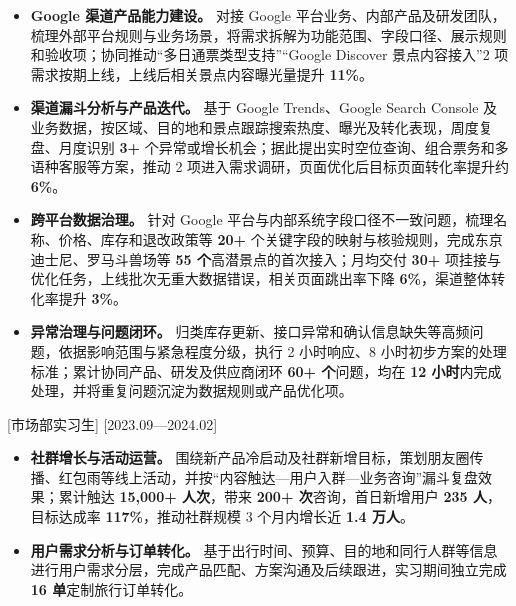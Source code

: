 \documentclass{resume}
\begin{document}
\begin{itemize}

\item \textbf{Google 渠道产品能力建设。} 对接 Google 平台业务、内部产品及研发团队，梳理外部平台规则与业务场景，将需求拆解为功能范围、字段口径、展示规则和验收项；协同推动“多日通票类型支持”“Google Discover 景点内容接入”2 项需求按期上线，上线后相关景点内容曝光量提升 \textbf{11\%}。

\item \textbf{渠道漏斗分析与产品迭代。} 基于 Google Trends、Google Search Console 及业务数据，按区域、目的地和景点跟踪搜索热度、曝光及转化表现，周度复盘、月度识别 \textbf{3+} 个异常或增长机会；据此提出实时空位查询、组合票务和多语种客服等方案，推动 2 项进入需求调研，页面优化后目标页面转化率提升约 \textbf{6\%}。

\item \textbf{跨平台数据治理。} 针对 Google 平台与内部系统字段口径不一致问题，梳理名称、价格、库存和退改政策等 \textbf{20+} 个关键字段的映射与核验规则，完成东京迪士尼、罗马斗兽场等 \textbf{55 个}高潜景点的首次接入；月均交付 \textbf{30+} 项挂接与优化任务，上线批次无重大数据错误，相关页面跳出率下降 \textbf{6\%}，渠道整体转化率提升 \textbf{3\%}。

\item \textbf{异常治理与问题闭环。} 归类库存更新、接口异常和确认信息缺失等高频问题，依据影响范围与紧急程度分级，执行 2 小时响应、8 小时初步方案的处理标准；累计协同产品、研发及供应商闭环 \textbf{60+ 个}问题，均在 \textbf{12 小时}内完成处理，并将重复问题沉淀为数据规则或产品优化项。

\end{itemize}

[\textnormal{市场部实习生}]
[2023.09—2024.02]

\begin{itemize}

\item \textbf{社群增长与活动运营。} 围绕新产品冷启动及社群新增目标，策划朋友圈传播、红包雨等线上活动，并按“内容触达—用户入群—业务咨询”漏斗复盘效果；累计触达 \textbf{15,000+ 人次}，带来 \textbf{200+ 次}咨询，首日新增用户 \textbf{235 人}，目标达成率 \textbf{117\%}，推动社群规模 3 个月内增长近 \textbf{1.4 万人}。

\item \textbf{用户需求分析与订单转化。} 基于出行时间、预算、目的地和同行人群等信息进行用户需求分层，完成产品匹配、方案沟通及后续跟进，实习期间独立完成 \textbf{16 单}定制旅行订单转化。

\end{itemize}
\end{document}
